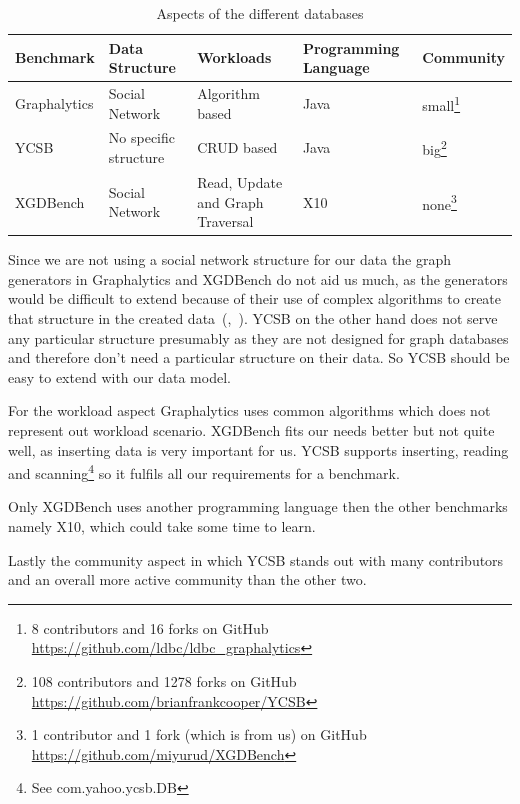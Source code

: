 \begin{table}[!h]
  \caption{Aspects of the different databases}
  \label{tab:benchmarkComparison}
  \begin{minipage}{\textwidth}
    \begin{tabularx}{\textwidth}{ | l | X | X | X | l | }
      \hline
      Benchmark & Data Structure & Workloads & Programming Language & Community \\ \hline
      Graphalytics & Social Network & Algorithm based & Java & small\footnote{8 contributors and 16 forks on GitHub \url{https://github.com/ldbc/ldbc_graphalytics}} \\ \hline
      YCSB & No specific structure & CRUD based & Java & big\footnote{108 contributors and 1278 forks on GitHub \url{https://github.com/brianfrankcooper/YCSB}} \\ \hline
      XGDBench & Social Network & Read, Update and Graph Traversal & X10 & none\footnote{1 contributor and 1 fork (which is from us) on GitHub \url{https://github.com/miyurud/XGDBench}} \\ \hline
    \end{tabularx}
  \end{minipage}
\end{table}

Since we are not using a social network structure for our data the graph generators in Graphalytics and XGDBench do not aid us much,
as the generators would be difficult to extend because of their use of complex algorithms to create that structure in the created data~(\cite{Erling2015},~\cite{Dayarathna2012}).
YCSB on the other hand does not serve any particular structure presumably as they are not designed for graph databases and therefore don't need a particular structure on their data.
So YCSB should be easy to extend with our data model.

For the workload aspect Graphalytics uses common algorithms which does not represent out workload scenario.
XGDBench fits our needs better but not quite well, as inserting data is very important for us.
YCSB supports inserting, reading and scanning\footnote{See com.yahoo.ycsb.DB} so it fulfils all our requirements for a benchmark.

Only XGDBench uses another programming language then the other benchmarks namely X10,
which could take some time to learn.

Lastly the community aspect in which YCSB stands out with many contributors and an overall more active community than the other two.

